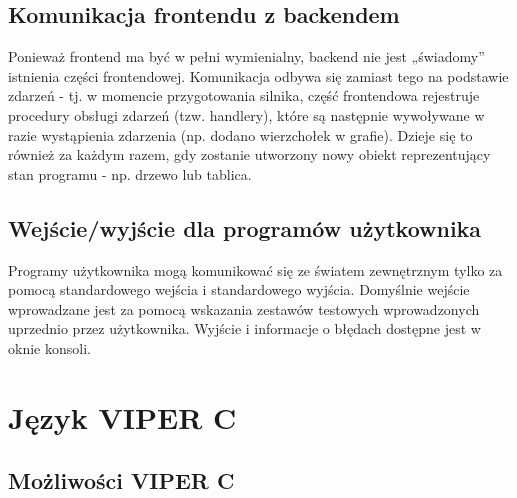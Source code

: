 \documentclass[a4paper,twoside,openright,11pt]{report}
\begin{document}
  \section{Komunikacja frontendu z backendem}
\par Ponieważ frontend ma być w pełni wymienialny, backend nie jest „świadomy” istnienia części frontendowej. Komunikacja odbywa się zamiast tego na podstawie zdarzeń - tj. w momencie
przygotowania silnika, część frontendowa rejestruje procedury obsługi zdarzeń (tzw. handlery), które są następnie wywoływane w razie wystąpienia zdarzenia (np. dodano wierzchołek w grafie). Dzieje się to również za każdym razem, gdy zostanie utworzony nowy obiekt reprezentujący stan programu - np. drzewo lub tablica.

  \section {Wejście/wyjście dla programów użytkownika}
  \par Programy użytkownika mogą komunikować się ze światem zewnętrznym tylko za pomocą standardowego wejścia i standardowego wyjścia. Domyślnie wejście wprowadzane jest za pomocą wskazania zestawów testowych wprowadzonych uprzednio przez użytkownika. Wyjście i informacje o błędach dostępne jest w oknie konsoli.

  \chapter {Język VIPER C}

  \section {Możliwości VIPER C}
\end{document}
